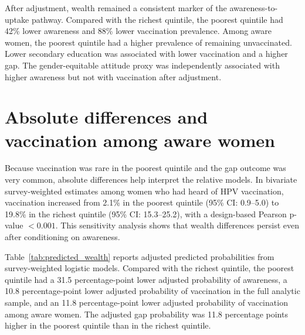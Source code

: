After adjustment, wealth remained a consistent marker of the awareness-to-uptake pathway. Compared with the richest quintile, the poorest quintile had 42\% lower awareness and 88\% lower vaccination prevalence. Among aware women, the poorest quintile had a higher prevalence of remaining unvaccinated. Lower secondary education was associated with lower vaccination and a higher gap. The gender-equitable attitude proxy was independently associated with higher awareness but not with vaccination after adjustment.

\section{Absolute differences and vaccination among aware women}

Because vaccination was rare in the poorest quintile and the gap outcome was very common, absolute differences help interpret the relative models. In bivariate survey-weighted estimates among women who had heard of HPV vaccination, vaccination increased from 2.1\% in the poorest quintile (95\% CI: 0.9--5.0) to 19.8\% in the richest quintile (95\% CI: 15.3--25.2), with a design-based Pearson p-value $<0.001$. This sensitivity analysis shows that wealth differences persist even after conditioning on awareness.

Table~\ref{tab:predicted_wealth} reports adjusted predicted probabilities from survey-weighted logistic models. Compared with the richest quintile, the poorest quintile had a 31.5 percentage-point lower adjusted probability of awareness, a 10.8 percentage-point lower adjusted probability of vaccination in the full analytic sample, and an 11.8 percentage-point lower adjusted probability of vaccination among aware women. The adjusted gap probability was 11.8 percentage points higher in the poorest quintile than in the richest quintile.

